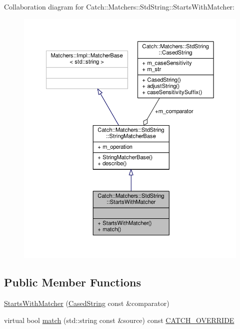 Collaboration diagram for Catch\-:\-:Matchers\-:\-:Std\-String\-:\-:Starts\-With\-Matcher\-:
\nopagebreak
\begin{figure}[H]
\begin{center}
\leavevmode
\includegraphics[width=350pt]{struct_catch_1_1_matchers_1_1_std_string_1_1_starts_with_matcher__coll__graph}
\end{center}
\end{figure}
\subsection*{Public Member Functions}
\begin{DoxyCompactItemize}
\item 
\hyperlink{struct_catch_1_1_matchers_1_1_std_string_1_1_starts_with_matcher_a7b86f258bdbd131a6e7bcd94a8977325}{Starts\-With\-Matcher} (\hyperlink{struct_catch_1_1_matchers_1_1_std_string_1_1_cased_string}{Cased\-String} const \&comparator)
\item 
virtual bool \hyperlink{struct_catch_1_1_matchers_1_1_std_string_1_1_starts_with_matcher_a0d37b1ddba7f1031e360ccd475f05d0d}{match} (std\-::string const \&source) const \hyperlink{catch_8hpp_a8ecdce4d3f57835f707915ae831eb847}{C\-A\-T\-C\-H\-\_\-\-O\-V\-E\-R\-R\-I\-D\-E}
\end{DoxyCompactItemize}
